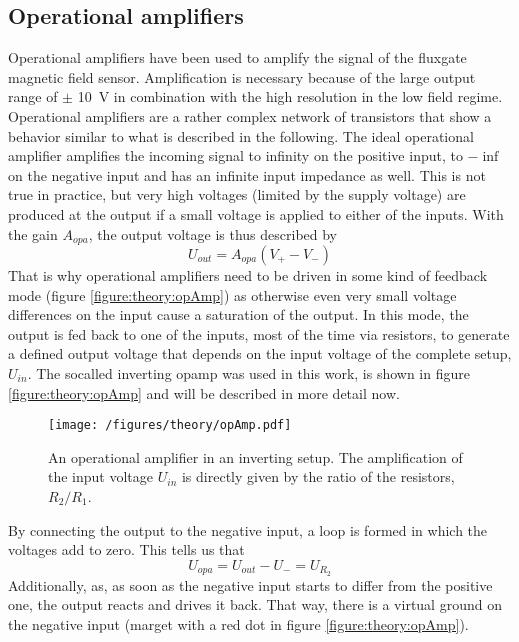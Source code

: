             \subsection{Operational amplifiers}
            Operational amplifiers have been used to amplify the signal of the fluxgate magnetic field sensor. Amplification is necessary because of the large output range of $\pm$ \SI{10}{\volt} in combination with the high resolution in the low field regime. Operational amplifiers are a rather complex network of transistors that show a behavior similar to what is described in the following. The ideal operational amplifier amplifies the incoming signal to infinity on the positive input, to $-\inf$ on the negative input and has an infinite input impedance as well. This is not true in practice, but very high voltages (limited by the supply voltage) are produced at the output if a small voltage is applied to either of the inputs. With the gain $A_{opa}$, the output voltage is thus described by
            \begin{equation}
                    \label{equation:theory:OPAvoltage}
                U_{out} = A_{opa}(V_+ - V_-)
            \end{equation}
            That is why operational amplifiers need to be driven in some kind of feedback mode (figure \ref{figure:theory:opAmp}) as otherwise even very small voltage differences on the input cause a saturation of the output. In this mode, the output is fed back to one of the inputs, most of the time via resistors, to generate a defined output voltage that depends on the input voltage of the complete setup, $U_{in}$. The socalled inverting opamp was used in this work, is shown in figure \ref{figure:theory:opAmp} and will be described in more detail now.
            \begin{figure}
                \texttt{[image: /figures/theory/opAmp.pdf]}
                \caption[Operational amplifier]{An operational amplifier in an inverting setup. The amplification of the input voltage $U_{in}$ is directly given by the ratio of the resistors, $R_2/R_1$.}
            \end{figure}
                By connecting the output to the negative input, a loop is formed in which the voltages add to zero. This tells us that
                \begin{equation*}
                    U_{opa} = U_{out} - U_- = U_{R_2}
                \end{equation*}
                Additionally, as, as soon as the negative input starts to differ from the positive one, the output reacts and drives it back. That way, there is a virtual ground on the negative input (marget with a red dot in figure \ref{figure:theory:opAmp}).
